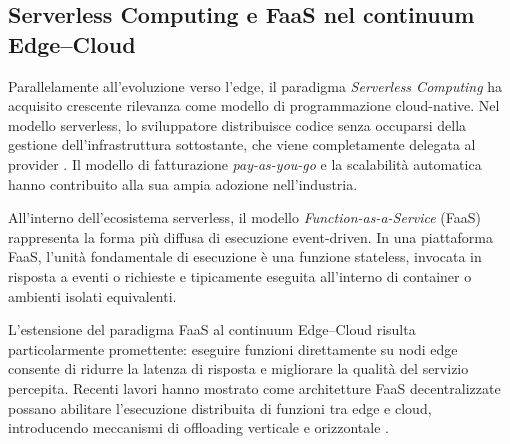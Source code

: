 \subsection*{Serverless Computing e FaaS nel continuum Edge--Cloud}

Parallelamente all'evoluzione verso l'edge, il paradigma
\emph{Serverless Computing} ha acquisito crescente rilevanza
come modello di programmazione cloud-native.
Nel modello serverless, lo sviluppatore distribuisce codice
senza occuparsi della gestione dell'infrastruttura sottostante,
che viene completamente delegata al provider
\cite{VanEyk2018_ServerlessIsMore}.
Il modello di fatturazione \emph{pay-as-you-go} e la scalabilità
automatica hanno contribuito alla sua ampia adozione nell'industria.

All'interno dell'ecosistema serverless, il modello
\emph{Function-as-a-Service} (FaaS) rappresenta la forma
più diffusa di esecuzione event-driven.
In una piattaforma FaaS, l'unità fondamentale di
esecuzione è una funzione stateless, invocata in risposta a
eventi o richieste e tipicamente eseguita all'interno di
container o ambienti isolati equivalenti.

L'estensione del paradigma FaaS al continuum Edge--Cloud
risulta particolarmente promettente: eseguire funzioni
direttamente su nodi edge consente di ridurre la latenza
di risposta e migliorare la qualità del servizio percepita.
Recenti lavori hanno mostrato come architetture FaaS
decentralizzate possano abilitare l'esecuzione distribuita
di funzioni tra edge e cloud, introducendo meccanismi di
offloading verticale e orizzontale \cite{Russo2023_Serverledge}.
